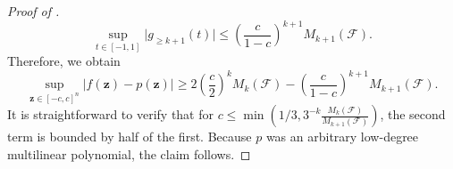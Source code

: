 \documentclass[10pt,a4paper]{article}
\theoremstyle{definition}
\begin{document}
\begin{proof}[Proof of ]
\begin{equation*}
    \sup_{t\in [-1,1]} \vert g_{\geq k+1}(t)\vert\leq \left(\frac{c}{1-c}\right)^{k+1}M_{k+1}(\mathcal{F}).
\end{equation*}
Therefore, we obtain
\begin{equation*}
    \sup_{\mathbf{z}\in [-c,c]^n} \vert f(\mathbf{z})-p(\mathbf{z})\vert\geq 2\left(\frac{c}{2}\right)^kM_k(\mathcal{F})-\left(\frac{c}{1-c}\right)^{k+1}M_{k+1}(\mathcal{F}).
\end{equation*}
It is straightforward to verify that for $c\leq \min\left(1/3, 3^{-k}  \frac{M_k(\mathcal{F})}{M_{k+1}(\mathcal{F})}\right)$, the second term is bounded by half of the first. Because $p$ was an arbitrary low-degree multilinear polynomial, the claim follows.
\end{proof}
\end{document}
